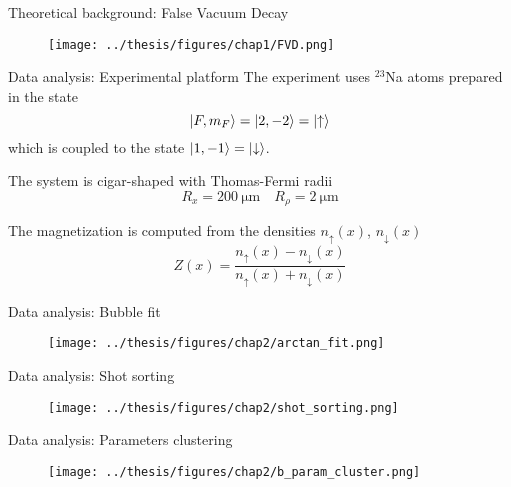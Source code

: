 \documentclass[handout]{beamer}
\begin{document}
\begin{frame}{Theoretical background: False Vacuum Decay}
    \begin{figure}
        \centering
        \texttt{[image: ../thesis/figures/chap1/FVD.png]}
    \end{figure}    
\end{frame}

\begin{frame}{Data analysis: Experimental platform}
    The experiment uses $^{23}$Na atoms prepared in the state
    \begin{equation*}
        \ket{F,m_F} = \ket{2, -2} = \ket{\uparrow}
    \end{equation*}
    which is coupled to the state $\ket{1, -1} = \ket{\downarrow}$.

    The system is cigar-shaped with Thomas-Fermi radii 
    \begin{equation*}
        R_x = 200\ \unit{\micro\meter} \quad R_\rho = 2\ \unit{\micro\meter}
    \end{equation*}

    The magnetization is computed from the densities $n_\uparrow(x)$, $n_\downarrow(x)$
    \begin{equation*}
        Z(x) = \frac{n_\uparrow(x) - n_\downarrow(x)}{n_\uparrow(x) + n_\downarrow(x)}
    \end{equation*}
\end{frame}

\begin{frame}{Data analysis: Bubble fit}
    \begin{figure}
        \centering
        \texttt{[image: ../thesis/figures/chap2/arctan\_fit.png]}
    \end{figure}
\end{frame}

\begin{frame}{Data analysis: Shot sorting}
    \begin{figure}
        \centering
        \texttt{[image: ../thesis/figures/chap2/shot\_sorting.png]}
    \end{figure}
\end{frame}

\begin{frame}{Data analysis: Parameters clustering}
    \begin{figure}
        \centering
        \texttt{[image: ../thesis/figures/chap2/b\_param\_cluster.png]}
    \end{figure}
\end{frame}
\end{document}
